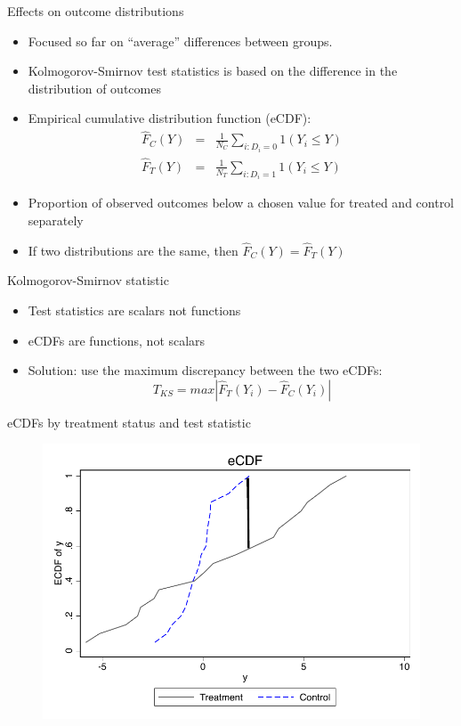 \documentclass{beamer}
\begin{document}
\begin{frame}{Effects on outcome distributions}

\begin{itemize}
\item Focused so far on ``average'' differences between groups.
\item Kolmogorov-Smirnov test statistics is based on the difference in the distribution of outcomes 
\item Empirical cumulative distribution function (eCDF): 
\begin{eqnarray*}
\widehat{F}_C(Y) &=& \frac{1}{N_C} \sum_{i:D_i=0} 1(Y_i \leq Y) \\
\widehat{F}_T(Y)&=& \frac{1}{N_T} \sum_{i:D_i=1} 1(Y_i \leq Y)
\end{eqnarray*}
\item Proportion of observed outcomes below a chosen value for treated and control separately
\item If two distributions are the same, then $\widehat{F}_C(Y) = \widehat{F}_T(Y)$
\end{itemize}

\end{frame}


\begin{frame}{Kolmogorov-Smirnov statistic}

\begin{itemize}
\item Test statistics are scalars not functions
\item eCDFs are functions, not scalars
\item Solution: use the maximum discrepancy between the two eCDFs:$$T_{KS} = max | \widehat{F}_T(Y_i) - \widehat{F}_C(Y_i) |$$
\end{itemize}

\end{frame}

\begin{frame}{eCDFs by treatment status and test statistic}

	\begin{figure}
	\includegraphics[scale=0.8]{./lecture_includes/ecdf.pdf}     
	\end{figure}
	
\end{frame}
\end{document}
